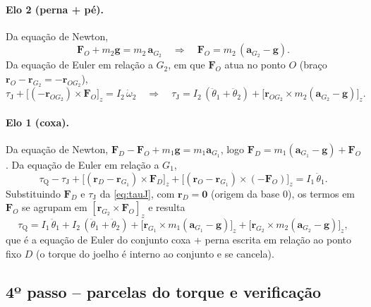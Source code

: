 \documentclass[12pt,a4paper,twoside]{article}
\numberwithin{equation}{section}
\begin{document}
\paragraph{Elo 2 (perna + pé).} Da equação de Newton,
\begin{equation}
  \mathbf F_O + m_2\mathbf g = m_2\,\mathbf a_{G_2}
  \quad\Longrightarrow\quad
  \mathbf F_O = m_2\,(\mathbf a_{G_2} - \mathbf g).
\end{equation}
Da equação de Euler em relação a $G_2$, em que $\mathbf F_O$ atua no ponto $O$ (braço
$\mathbf r_O - \mathbf r_{G_2} = -\mathbf r_{OG_2}$),
\begin{equation}
  \tau_{\mathrm J} + \big[(-\mathbf r_{OG_2})\times\mathbf F_O\big]_z = I_2\,\dot\omega_2
  \quad\Longrightarrow\quad
  \boxed{\tau_{\mathrm J} = I_2\,(\ddot\theta_1+\ddot\theta_2) + \big[\mathbf r_{OG_2}\times m_2(\mathbf a_{G_2} - \mathbf g)\big]_z .}
  \label{eq:tauJ}
\end{equation}

\paragraph{Elo 1 (coxa).} Da equação de Newton,
$\mathbf F_D - \mathbf F_O + m_1\mathbf g = m_1\mathbf a_{G_1}$, logo
$\mathbf F_D = m_1(\mathbf a_{G_1} - \mathbf g) + \mathbf F_O$. Da equação de Euler em relação a $G_1$,
\begin{equation}
  \tau_{\mathrm Q} - \tau_{\mathrm J} + \big[(\mathbf r_D - \mathbf r_{G_1})\times\mathbf F_D\big]_z
  + \big[(\mathbf r_O - \mathbf r_{G_1})\times(-\mathbf F_O)\big]_z = I_1\,\ddot\theta_1 .
\end{equation}
Substituindo $\mathbf F_D$ e $\tau_{\mathrm J}$ da \cref{eq:tauJ}, com $\mathbf r_D = \mathbf 0$ (origem da
base $0$), os termos em $\mathbf F_O$ se agrupam em $[\mathbf r_{G_2}\times\mathbf F_O]_z$ e resulta
\begin{equation}
  \boxed{\tau_{\mathrm Q} = I_1\,\ddot\theta_1 + I_2\,(\ddot\theta_1+\ddot\theta_2)
     + \big[\mathbf r_{G_1}\times m_1(\mathbf a_{G_1} - \mathbf g)\big]_z
     + \big[\mathbf r_{G_2}\times m_2(\mathbf a_{G_2} - \mathbf g)\big]_z ,}
  \label{eq:tauQ}
\end{equation}
que é a equação de Euler do conjunto coxa + perna escrita em relação ao ponto fixo $D$
(o torque do joelho é interno ao conjunto e se cancela).

\subsection{4º passo -- parcelas do torque e verificação}
\end{document}
